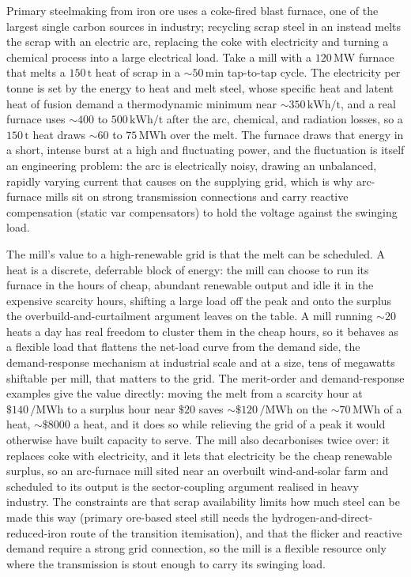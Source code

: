 Primary steelmaking from iron ore uses a coke-fired blast furnace, one of the
largest single carbon sources in industry; recycling scrap steel in an
 instead melts the scrap with an electric arc,
replacing the coke with electricity and turning a chemical process into a
large electrical load. Take a mill with a $120\,\si{\mega\watt}$ furnace that
melts a $150\,\text{t}$ heat of scrap in a $\sim 50\,\si{\minute}$ tap-to-tap
cycle. The electricity per tonne is set by the energy to heat and melt steel,
whose specific heat and latent heat of fusion demand a thermodynamic minimum
near $\sim 350\,\si{\kilo\watt\hour}/\text{t}$, and a real furnace uses
$\sim 400$ to $500\,\si{\kilo\watt\hour}/\text{t}$ after the arc, chemical, and
radiation losses, so a $150\,\text{t}$ heat draws $\sim 60$ to $75\,\si{\mega
\watt\hour}$ over the melt. The furnace draws that energy in a short, intense
burst at a high and fluctuating power, and the fluctuation is itself an
engineering problem: the arc is electrically noisy, drawing an unbalanced,
rapidly varying current that causes  on the supplying
grid, which is why arc-furnace mills sit on strong transmission connections and
carry reactive compensation (static var compensators) to hold the voltage
against the swinging load.

The mill's value to a high-renewable grid is that the melt can be scheduled.
A heat is a discrete, deferrable block of energy: the mill can choose to run
its furnace in the hours of cheap, abundant renewable output and idle it in
the expensive scarcity hours, shifting a large load off the peak and onto the
surplus the overbuild-and-curtailment argument leaves on the table. A mill
running $\sim 20$ heats a day has real freedom to cluster them in the cheap
hours, so it behaves as a flexible load that flattens the net-load curve from
the demand side, the demand-response mechanism at industrial scale and at a
size, tens of megawatts shiftable per mill, that matters to the grid. The
merit-order and demand-response examples give the value directly: moving the
melt from a scarcity hour at $\$140\,\si{\per\mega\watt\hour}$ to a surplus
hour near $\$20$ saves $\sim \$120\,\si{\per\mega\watt\hour}$ on the
$\sim 70\,\si{\mega\watt\hour}$ of a heat, $\sim \$8000$ a heat, and it does
so while relieving the grid of a peak it would otherwise have built capacity to
serve. The mill also decarbonises twice over: it replaces coke with
electricity, and it lets that electricity be the cheap renewable surplus, so an
arc-furnace mill sited near an overbuilt wind-and-solar farm and scheduled to
its output is the sector-coupling argument realised in heavy industry. The
constraints are that scrap availability limits how much steel can be made this
way (primary ore-based steel still needs the hydrogen-and-direct-reduced-iron
route of the transition itemisation), and that the flicker and reactive
demand require a strong grid connection, so the mill is a flexible resource
only where the transmission is stout enough to carry its swinging load.

